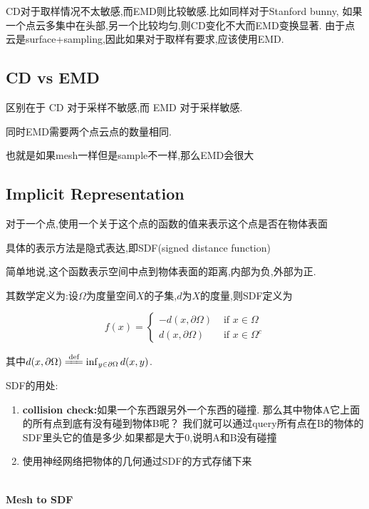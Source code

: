 CD对于取样情况不太敏感,而EMD则比较敏感.比如同样对于Stanford bunny,
如果一个点云多集中在头部,另一个比较均匀,则CD变化不大而EMD变换显著.
由于点云是surface+sampling,因此如果对于取样有要求,应该使用EMD.

\subsection{CD vs EMD}

区别在于 CD 对于采样不敏感,而 EMD 对于采样敏感.

同时EMD需要两个点云点的数量相同.

也就是如果mesh一样但是sample不一样,那么EMD会很大

\subsection{Implicit Representation}

对于一个点,使用一个关于这个点的函数的值来表示这个点是否在物体表面

具体的表示方法是隐式表达,即SDF(signed distance function)

简单地说,这个函数表示空间中点到物体表面的距离,内部为负,外部为正.

其数学定义为:设$\Omega$为度量空间$X$的子集,$d$为$X$的度量,则SDF定义为

\begin{equation}
    f(x)=\begin{cases}
        -d(x, \partial \Omega) & \text { if } x \in \Omega 
        \\
        d(x, \partial \Omega) & \text { if } x \in \Omega^{c}
    \end{cases}
\end{equation}

其中$d(x, \partial \Omega) \xlongequal{\text{def}} \inf_{y \in \partial \Omega} d(x, y)$.

SDF的用处:

\begin{enumerate}
    \item \textbf{collision check:}如果一个东西跟另外一个东西的碰撞.
    那么其中物体A它上面的所有点到底有没有碰到物体B呢？
    我们就可以通过query所有点在B的物体的SDF里头它的值是多少.如果都是大于0,说明A和B没有碰撞
    \item 使用神经网络把物体的几何通过SDF的方式存储下来
\end{enumerate}

\textbf{\\Mesh to SDF}

